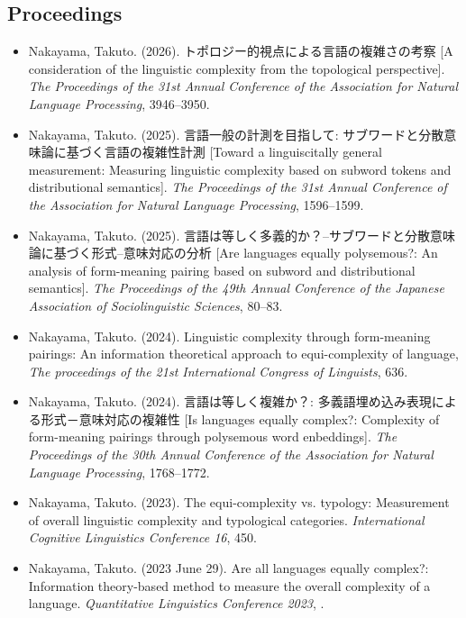 \documentclass[a4paper,11pt]{article}
\begin{document}
\subsection*{Proceedings}
\begin{itemize}[leftmargin=*, itemsep=0em, topsep=0em]
  \item Nakayama, Takuto. (2026). トポロジー的視点による言語の複雑さの考察 [A consideration of the linguistic complexity from the topological perspective]. \textit{The Proceedings of the 31st Annual Conference of the Association for Natural Language Processing}, 3946--3950.
  \item Nakayama, Takuto. (2025). 言語一般の計測を目指して: サブワードと分散意味論に基づく言語の複雑性計測 [Toward a linguiscitally general measurement: Measuring linguistic complexity based on subword tokens and distributional semantics]. \textit{The Proceedings of the 31st Annual Conference of the Association for Natural Language Processing}, 1596–1599.
  \item Nakayama, Takuto. (2025). 言語は等しく多義的か？–サブワードと分散意味論に基づく形式–意味対応の分析 [Are languages equally polysemous?: An analysis of form-meaning pairing based on subword and distributional semantics]. \textit{The Proceedings of the 49th Annual Conference of the Japanese Association of Sociolinguistic Sciences}, 80–83.
  \item Nakayama, Takuto. (2024). Linguistic complexity through form-meaning pairings: An information theoretical approach to equi-complexity of language, \textit{The proceedings of the 21st International Congress of Linguists}, 636.
  \item Nakayama, Takuto. (2024). 言語は等しく複雑か？: 多義語埋め込み表現による形式－意味対応の複雑性 [Is languages equally complex?: Complexity of form-meaning pairings through polysemous word enbeddings]. \textit{The Proceedings of the 30th Annual Conference of the Association for Natural Language Processing}, 1768–1772.
  \item Nakayama, Takuto. (2023). The equi-complexity vs. typology: Measurement of overall linguistic complexity and typological categories. \textit{International Cognitive Linguistics Conference 16}, 450.
  \item Nakayama, Takuto. (2023 June 29). Are all languages equally complex?: Information theory-based method to measure the overall complexity of a language. \textit{Quantitative Linguistics Conference 2023}, .
\end{itemize}
\end{document}
